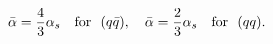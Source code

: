 \begin{equation}                              
\bar{\alpha} =\frac{4}{3} \alpha_{s} ~~~{\rm for}~~ (q\bar{q}),~~~                              
\bar{\alpha} =\frac{2}{3} \alpha_{s} ~~~{\rm for}~~ (q q).                              
\end{equation} 
